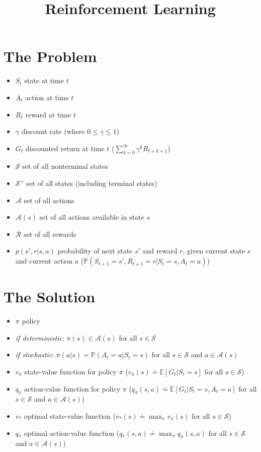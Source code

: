 \documentclass[12pt]{amsart}
\title{Reinforcement Learning}
\begin{document}
\maketitle
\thispagestyle{fancy}

\section{The Problem}

\begin{itemize}
\item[] $S_t$ \tabto{2cm} state at time $t$
\item[] $A_t$ \tabto{2cm} action at time $t$
\item[] $R_t$ \tabto{2cm} reward at time $t$
\item[] $\gamma$ \tabto{2cm} discount rate (where $0 \leq \gamma \leq 1$)
\item[] $G_t$ \tabto{2cm} discounted return at time $t$ ($\sum_{k=0}^\infty \gamma^k R_{t+k+1}$)
\item[] $\mathcal{S}$ \tabto{2cm} set of all nonterminal states
\item[] $\mathcal{S}^+$ \tabto{2cm} set of all states (including terminal states)
\item[] $\mathcal{A}$ \tabto{2cm} set of all actions 
\item[] $\mathcal{A}(s)$ \tabto{2cm} set of all actions available in state $s$
\item[] $\mathcal{R}$ \tabto{2cm} set of all rewards
\item[] $p(s',r|s,a)$ \tabto{2cm} probability of next state $s'$ and reward $r$, given current state $s$ and current action $a$ ($\mathbb{P}(S_{t+1}=s', R_{t+1}=r|S_t = s, A_t = a)$)
\end{itemize}

\section{The Solution}
\begin{itemize}
\item[] $\pi$ \tabto{2cm} policy 
\item[] \tabto{2.5cm} \textit{if deterministic}: $\pi(s) \in \mathcal{A}(s)$ for all $s \in \mathcal{S}$ 
\item[] \tabto{2.5cm} \textit{if stochastic}: $\pi(a|s) = \mathbb{P}(A_t=a|S_t=s)$ for all $s \in \mathcal{S}$ and $a \in \mathcal{A}(s)$
\item[] $v_\pi$ \tabto{2cm} state-value function for policy $\pi$ ($v_\pi(s) \doteq \mathbb{E}[G_t|S_t=s]$ for all $s\in\mathcal{S}$)
\item[] $q_\pi$ \tabto{2cm} action-value function for policy $\pi$ ($q_\pi(s,a) \doteq \mathbb{E}[G_t|S_t=s, A_t=a]$ for all $s \in \mathcal{S}$ and $a \in \mathcal{A}(s)$)
\item[] $v_*$ \tabto{2cm} optimal state-value function ($v_*(s) \doteq \max_\pi v_\pi(s)$ for all $s \in \mathcal{S}$)
\item[] $q_*$ \tabto{2cm} optimal action-value function ($q_*(s,a) \doteq \max_\pi q_\pi(s,a)$ for all $s \in \mathcal{S}$ and $a \in \mathcal{A}(s)$)
\end{itemize}
\end{document}
